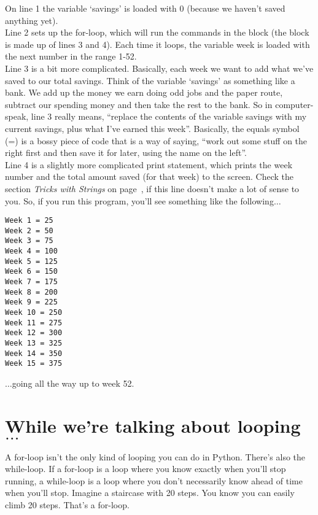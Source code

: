 On line 1 the variable `savings' is loaded with 0 (because we haven't saved anything yet).\\
Line 2 sets up the for-loop, which will run the commands in the block (the block is made up of lines 3 and 4).  Each time it loops, the variable week is loaded with the next number in the range 1-52.\\
Line 3 is a bit more complicated.  Basically, each week we want to add what we've saved to our total savings.  Think of the variable `savings' as something like a bank.  We add up the money we earn doing odd jobs and the paper route, subtract our spending money and then take the rest to the bank.  So in computer-speak, line 3 really means, ``replace the contents of the variable savings with my current savings, plus what I've earned this week''. Basically, the equals symbol (=) is a bossy piece of code that is a way of saying, ``work out some stuff on the right first and then save it for later, using the name on the left''.\\
Line 4 is a slightly more complicated print statement, which prints the week number and the total amount saved (for that week) to the screen.  Check the section \emph{Tricks with Strings} on page~\pageref{trickswithstrings}, if this line doesn't make a lot of sense to you. So, if you run this program, you'll see something like the following$\ldots$

\begin{listing}
\begin{verbatim}
Week 1 = 25
Week 2 = 50
Week 3 = 75
Week 4 = 100
Week 5 = 125
Week 6 = 150
Week 7 = 175
Week 8 = 200
Week 9 = 225
Week 10 = 250
Week 11 = 275
Week 12 = 300
Week 13 = 325
Week 14 = 350
Week 15 = 375
\end{verbatim}
\end{listing}

$\ldots$going all the way up to week 52.

\section{While we're talking about looping$\ldots$}

A for-loop isn't the only kind of looping you can do in Python. There's also the while-loop. If a for-loop is a loop where you know exactly when you'll stop running, a while-loop is a loop where you don't necessarily know ahead of time when you'll stop. Imagine a staircase with 20 steps.  You know you can easily climb 20 steps.  That's a for-loop.

